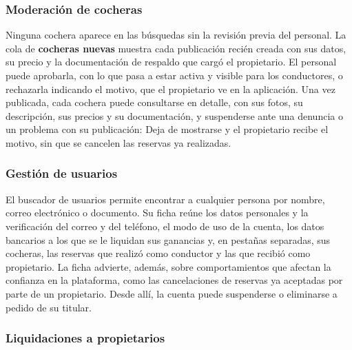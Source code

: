 
\FloatBarrier
\subsubsection{Moderación de cocheras}

Ninguna cochera aparece en las búsquedas sin la revisión previa del personal. La cola de \textbf{cocheras nuevas} muestra cada publicación recién creada con sus datos, su precio y la documentación de respaldo que cargó el propietario. El personal puede aprobarla, con lo que pasa a estar activa y visible para los conductores, o rechazarla indicando el motivo, que el propietario ve en la aplicación. Una vez publicada, cada cochera puede consultarse en detalle, con sus fotos, su descripción, sus precios y su documentación, y suspenderse ante una denuncia o un problema con su publicación: Deja de mostrarse y el propietario recibe el motivo, sin que se cancelen las reservas ya realizadas.


\FloatBarrier
\subsubsection{Gestión de usuarios}

El buscador de usuarios permite encontrar a cualquier persona por nombre, correo electrónico o documento. Su ficha reúne los datos personales y la verificación del correo y del teléfono, el modo de uso de la cuenta, los datos bancarios a los que se le liquidan sus ganancias y, en pestañas separadas, sus cocheras, las reservas que realizó como conductor y las que recibió como propietario. La ficha advierte, además, sobre comportamientos que afectan la confianza en la plataforma, como las cancelaciones de reservas ya aceptadas por parte de un propietario. Desde allí, la cuenta puede suspenderse o eliminarse a pedido de su titular.


\FloatBarrier
\subsubsection{Liquidaciones a propietarios}

